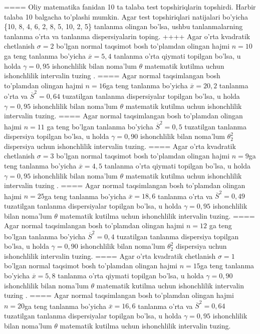 ====
Oliy matematika fanidan 10 ta talaba test topshiriqlarin topshirdi. Harbir talaba 10 balgacha to'plashi mumkin. Agar test topshiriqlari natijalari bo'yicha \{10, 8, 4, 6, 2, 8, 5, 10, 2, 5\} tanlanma olingan bo'lsa, ushbu tanlanmalarning tanlanma o'rta va tanlanma dispersiyalarin toping.
++++
Agar o'rta kvadratik chetlanish \(\sigma = 2\) bo'lgan normal taqsimot bosh to'plamdan olingan hajmi \(n = 10\)ga teng tanlanma bo'yicha \(\overline{x} = 5,4\) tanlanma o'rta qiymati topilgan bo'lsa, u holda \(\gamma = 0,95\) ishonchlilik bilan noma'lum \(\theta\) matematik kutilma uchun ishonchlilik intervalin tuzing .
====
Agar normal taqsimlangan bosh to'plamdan olingan hajmi \(n = 16\)ga teng tanlanma bo'yicha \(\overline{x} = 20,2\) tanlanma o'rta va \({\overline{S}}^{2} = 0,64\) tuzatilgan tanlanma dispersiyalar topilgan bo'lsa, u holda \(\gamma = 0,95\) ishonchlilik bilan noma'lum \(\theta\) matematik kutilma uchun ishonchlilik intervalin tuzing.
====
Agar normal taqsimlangan bosh to'plamdan olingan hajmi \(n = 11\) ga teng bo'lgan tanlanma bo'yicha \({\overline{S}}^{2} = 0,5\) tuzatilgan tanlanma dispersiya topilgan bo'lsa, u holda \(\gamma = 0,90\) ishonchlilik bilan noma'lum \(\theta_{2}^{2}\) dispersiya uchun ishonchlilik intervalin tuzing.
====
Agar o'rta kvadratik chetlanish \(\sigma = 3\) bo'lgan normal taqsimot bosh to'plamdan olingan hajmi \(n = 9\)ga teng tanlanma bo'yicha \(\overline{x} = 4,5\) tanlanma o'rta qiymati topilgan bo'lsa, u holda \(\gamma = 0,95\) ishonchlilik bilan noma'lum \(\theta\) matematik kutilma uchun ishonchlilik intervalin tuzing .
====
Agar normal taqsimlangan bosh to'plamdan olingan hajmi \(n = 25\)ga teng tanlanma bo'yicha \(\overline{x} = 18,6\) tanlanma o'rta va \({\overline{S}}^{2} = 0,49\) tuzatilgan tanlanma dispersiyalar topilgan bo'lsa, u holda \(\gamma = 0,95\) ishonchlilik bilan noma'lum \(\theta\) matematik kutilma uchun ishonchlilik intervalin tuzing.
====
Agar normal taqsimlangan bosh to'plamdan olingan hajmi \(n = 12\) ga teng bo'lgan tanlanma bo'yicha \({\overline{S}}^{2} = 0,4\) tuzatilgan tanlanma dispersiya topilgan bo'lsa, u holda \(\gamma = 0,90\) ishonchlilik bilan noma'lum \(\theta_{2}^{2}\) dispersiya uchun ishonchlilik intervalin tuzing.
====
Agar o'rta kvadratik chetlanish \(\sigma = 1\) bo'lgan normal taqsimot bosh to'plamdan olingan hajmi \(n = 15\)ga teng tanlanma bo'yicha \(\overline{x} = 5,8\) tanlanma o'rta qiymati topilgan bo'lsa, u holda \(\gamma = 0,90\) ishonchlilik bilan noma'lum \(\theta\) matematik kutilma uchun ishonchlilik intervalin tuzing .
====
Agar normal taqsimlangan bosh to'plamdan olingan hajmi \(n = 20\)ga teng tanlanma bo'yicha \(\overline{x} = 16,6\) tanlanma o'rta va \({\overline{S}}^{2} = 0,64\) tuzatilgan tanlanma dispersiyalar topilgan bo'lsa, u holda \(\gamma = 0,95\) ishonchlilik bilan noma'lum \(\theta\) matematik kutilma uchun ishonchlilik intervalin tuzing.
